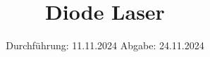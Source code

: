 

\subject{V60}
\title{Diode Laser}
\date{%
  Durchführung: 11.11.2024
  \hspace{3em}
  Abgabe: 24.11.2024
}



\maketitle
\thispagestyle{empty}
\tableofcontents
\newpage







\printbibliography{}





